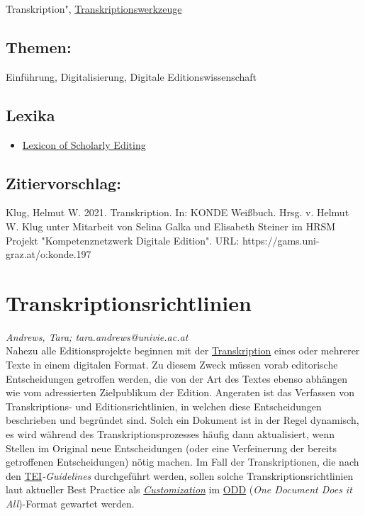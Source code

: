 \documentclass{article}
\begin{document}
{                           Transkription"}, \href{https://gams.uni-graz.at/o:konde.199}{Transkriptionswerkzeuge}\subsection*{Themen:}Einführung, Digitalisierung, Digitale Editionswissenschaft\subsection*{Lexika}\begin{itemize}\item \href{https://lexiconse.uantwerpen.be/index.php/lexicon/transcription/}{Lexicon of Scholarly Editing}\end{itemize}\subsection*{Zitiervorschlag:}Klug, Helmut W. 2021. Transkription. In: KONDE Weißbuch. Hrsg. v. Helmut W. Klug unter Mitarbeit von Selina Galka und Elisabeth Steiner im HRSM Projekt "Kompetenznetzwerk Digitale Edition". URL: https://gams.uni-graz.at/o:konde.197\newpage\section*{Transkriptionsrichtlinien} \emph{Andrews, Tara; tara.andrews@univie.ac.at }\\
        
    Nahezu alle Editionsprojekte beginnen mit der \href{http://gams.uni-graz.at/o:konde.197}{Transkription} eines oder mehrerer Texte in einem
                  digitalen Format. Zu diesem Zweck müssen vorab editorische Entscheidungen
                  getroffen werden, die von der Art des Textes ebenso abhängen wie vom adressierten
                  Zielpublikum der Edition. Angeraten ist das Verfassen von Transkriptions- und
                  Editionsrichtlinien, in welchen diese Entscheidungen beschrieben und begründet
                  sind. Solch ein Dokument ist in der Regel dynamisch, es wird während des
                  Transkriptionsprozesses häufig dann aktualisiert, wenn Stellen im Original neue
                  Entscheidungen (oder eine Verfeinerung der bereits getroffenen Entscheidungen)
                  nötig machen. Im Fall der Transkriptionen, die nach den \href{http://gams.uni-graz.at/o:konde.178}{TEI}\emph{-Guidelines} durchgeführt werden, sollen solche
                  Transkriptionsrichtlinien laut aktueller Best Practice als \emph{\href{http://gams.uni-graz.at/o:konde.180}{Customization}} im \href{http://gams.uni-graz.at/o:konde.150}{ODD} (\emph{One Document Does it All})-Format gewartet werden.\\
            
\end{document}
